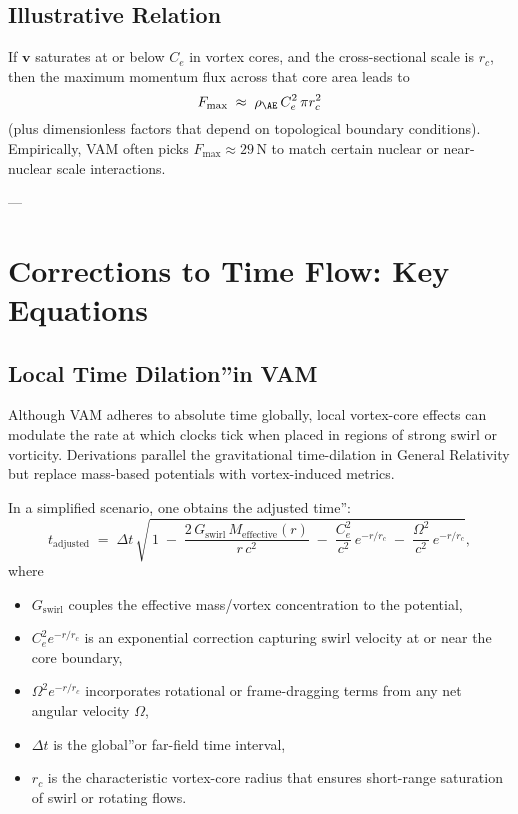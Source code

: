 \subsection{Illustrative Relation}
If \(\mathbf{v}\) saturates at or below \(C_e\) in vortex cores, and the cross-sectional scale is \(r_c\), then the maximum momentum flux across that core area leads to
\[
    F_{\max}
    \;\approx\;
    \rho_{\mathrm{\AE}}\, C_e^2\, \pi r_c^2
\]
(plus dimensionless factors that depend on topological boundary conditions). Empirically, VAM often picks \(F_{\max}\approx 29\,\mathrm{N}\) to match certain nuclear or near-nuclear scale interactions.

---

\section{Corrections to Time Flow: Key Equations}

\subsection{Local Time \grqq Dilation\textquotedblright in VAM}
Although VAM adheres to absolute time globally, local vortex-core effects can modulate the rate at which clocks tick when placed in regions of strong swirl or vorticity. Derivations parallel the gravitational time-dilation in General Relativity but replace mass-based potentials with vortex-induced metrics.

In a simplified scenario, one obtains the \grqq adjusted time\textquotedblright:
\[
    t_\text{adjusted}
    \;=\;
    \Delta t \,\sqrt{\,1 \;-\; \frac{2\,G_\text{swirl}\,M_\text{effective}(r)}{r\,c^2}
    \;-\;
    \frac{C_e^2}{c^2} \, e^{-r/r_c}
        \;-\;
        \frac{\Omega^2}{c^2} \, e^{-r/r_c}
    },
\]
where
\begin{itemize}
    \item \(G_\text{swirl}\) couples the effective mass/vortex concentration to the potential,
    \item \(C_e^2 e^{-r/r_c}\) is an exponential correction capturing swirl velocity at or near the core boundary,
    \item \(\Omega^2 e^{-r/r_c}\) incorporates rotational or frame-dragging terms from any net angular velocity \(\Omega\),
    \item \(\Delta t\) is the \grqq global\textquotedblright or far-field time interval,
    \item \(r_c\) is the characteristic vortex-core radius that ensures short-range saturation of swirl or rotating flows.
\end{itemize}

